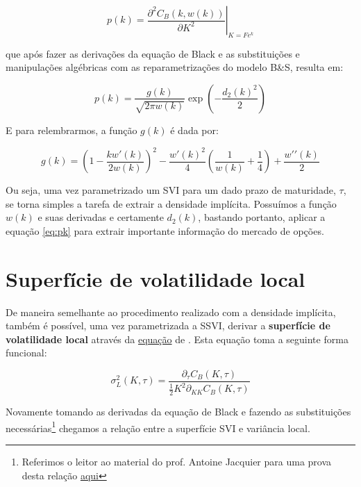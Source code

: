 \documentclass[]{book}
\let\rmarkdownfootnote\footnote%
\def\footnote{\protect\rmarkdownfootnote}
\theoremstyle{definition}
\theoremstyle{definition}
\theoremstyle{definition}
\theoremstyle{remark}
\begin{document}
\begin{equation}
p(k)=\left.\frac{\partial^2C_B(k, w(k))}{\partial K^2}\right|_{K=Fe^k} 
\end{equation}

que após fazer as derivações da equação de Black e as substituições e manipulações algébricas com as reparametrizações do modelo B\&S, resulta em:

\begin{equation}
p(k)=\frac{g(k)}{\sqrt{2\pi w(k)}}\exp\left(-\frac{d_2(k)^2}{2}\right)
\label{eq:pk}
\end{equation}

E para relembrarmos, a função \(g(k)\) é dada por:

\begin{equation}
g(k)=\left(1-\frac{kw\prime(k)}{2w(k)}\right)^2-\frac{w\prime(k)^2}{4}\left(\frac{1}{w(k)}+\frac{1}{4}\right)+\frac{w\prime\prime(k)}{2}
\label{eq:g}
\end{equation}

Ou seja, uma vez parametrizado um SVI para um dado prazo de maturidade, \(\tau\), se torna simples a tarefa de extrair a densidade implícita. Possuímos a função \(w(k)\) e suas derivadas e certamente \(d_2(k)\), bastando portanto, aplicar a equação \eqref{eq:pk} para extrair importante informação do mercado de opções.

\hypertarget{superficie-de-volatilidade-local}{%
\section{Superfície de volatilidade local}\label{superficie-de-volatilidade-local}}

De maneira semelhante ao procedimento realizado com a densidade implícita, também é possível, uma vez parametrizada a SSVI, derivar a \textbf{superfície de volatilidade local} através da \protect\hyperlink{superficies}{equação} de \citep{Dupire1994}. Esta equação toma a seguinte forma funcional:

\begin{equation}
\sigma_L^2(K, \tau)=\frac{\partial_\tau C_B(K, \tau)}{\frac{1}{2}K^2\partial_{KK}C_B(K, \tau)}
\label{eq:dupire}
\end{equation}

Novamente tomando as derivadas da equação de Black e fazendo as substituições necessárias\footnote{Referimos o leitor ao material do prof. Antoine Jacquier para uma prova desta relação \href{http://wwwf.imperial.ac.uk/~ajacquie/IC_AMDP/IC_AMDP_Docs/AMDP.pdf}{aqui}} chegamos a relação entre a superfície SVI e variância local.
\end{document}

